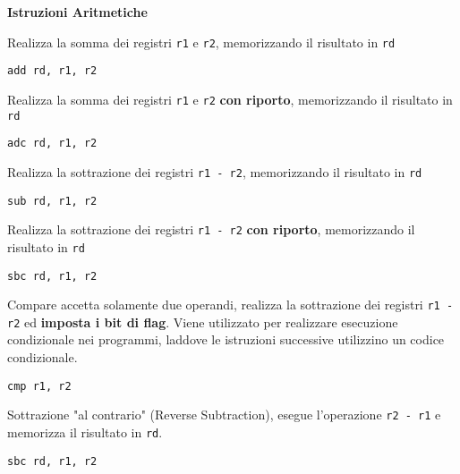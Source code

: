 \begin{defn}
\textbf{Istruzioni Aritmetiche}

Realizza la somma dei registri \texttt{r1} e \texttt{r2}, memorizzando il risultato in \texttt{rd}
\begin{lstlisting}[style=arm]
add rd, r1, r2
\end{lstlisting}

Realizza la somma dei registri \texttt{r1} e \texttt{r2} \textbf{con riporto}, memorizzando il risultato in \texttt{rd}
\begin{lstlisting}[style=arm]
adc rd, r1, r2
\end{lstlisting}

Realizza la sottrazione dei registri \texttt{r1 - r2}, memorizzando il risultato in \texttt{rd}
\begin{lstlisting}[style=arm]
sub rd, r1, r2
\end{lstlisting}

Realizza la sottrazione dei registri \texttt{r1 - r2} \textbf{con riporto}, memorizzando il risultato in \texttt{rd}
\begin{lstlisting}[style=arm]
sbc rd, r1, r2
\end{lstlisting}

Compare accetta solamente due operandi, realizza la sottrazione dei registri \texttt{r1 - r2} ed \textbf{imposta i bit di flag}. Viene utilizzato per realizzare esecuzione condizionale nei programmi, laddove le istruzioni successive utilizzino un codice condizionale.
\begin{lstlisting}[style=arm]
cmp r1, r2
\end{lstlisting}

Sottrazione "al contrario" (Reverse Subtraction), esegue l'operazione \texttt{r2 - r1} e memorizza il risultato in \texttt{rd}.
\begin{lstlisting}[style=arm]
sbc rd, r1, r2
\end{lstlisting}

\end{defn}

